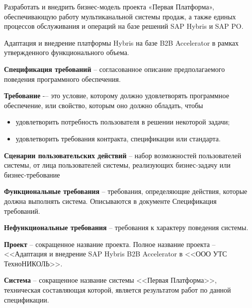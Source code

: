




	

	Разработать и внедрить бизнес-модель проекта «Первая Платформа», обеспечивающую работу мультиканальной системы продаж, а также единых процессов обслуживания и операций на базе решений SAP Hybris и SAP PO.
	

	Адаптация и внедрение платформы Hybris на базе B2B Accelerator в рамках утвержденного функционального объема. 	


\textbf{Спецификация требований} -- согласованное описание предполагаемого поведения программного обеспечения.

\textbf{Требование} -– это условие, которому должно удовлетворять программное обеспечение, или свойство, которым оно должно обладать, чтобы 
\begin{itemize}
\item удовлетворить потребность пользователя в решении некоторой задачи; 
\item удовлетворить требования контракта, спецификации или стандарта. 
\end{itemize}


\textbf{Сценарии пользовательских действий} -- набор возможностей пользователей системы, от лица пользователей системы, реализующих бизнес-задачу или бизнес-требование

\textbf{Функциональные требования} -- требования, определяющие действия, которые должна выполнять система. Описываются в документе Спецификация требований.

\textbf{Нефункциональные требования} -- требования к характеру поведения системы.

\textbf{Проект} -- сокращенное название проекта. Полное название проекта -- <<Адаптация и внедрение SAP Hybris B2B Accelerator в <<ООО УТС ТехноНИКОЛЬ>>. 

\textbf{Система} -- сокращенное название системы <<Первая Платформа>>, техническая составляющая которой, является результатом работ по данной спецификации.

